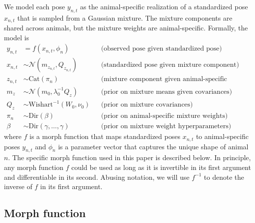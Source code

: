 \documentclass{article}         %
\newcommand{\NN}{\mathcal{N}}
\begin{document}
We model each pose $y_{n,t}$ as the animal-specific realization of a standardized pose $x_{n,t}$ that is sampled from a Gaussian mixture. The mixture components are shared across animals, but the mixture weights are animal-specific. Formally, the model is
%
\begin{align*}
    y_{n,t} & = f(x_{n,t}, \phi_n) 
        && \text{(observed pose given standardized pose)} \\
    x_{n,t} & \sim \NN(m_{z_{n,t}}, Q_{z_{n,t}}) 
        && \text{(standardized pose given mixture component)}  \\
    z_{n,t} & \sim \text{Cat}(\pi_n)  
        && \text{(mixture component given animal-specific weights)} \\
    m_z & \sim \NN(m_0, \lambda_0^{-1} Q_z) 
        && \text{(prior on mixture means given covariances)} \\
    Q_z & \sim \text{Wishart}^{-1}(W_0, \nu_0) 
        && \text{(prior on mixture covariances)} \\
    \pi_n & \sim \text{Dir}(\beta)
        && \text{(prior on animal-specific mixture weights)} \\
    \beta & \sim \text{Dir}(\gamma,\dots,\gamma)
        && \text{(prior on mixture weight hyperparameters)}
\end{align*}   
%
where $f$ is a morph function that maps standardized poses $x_{n,t}$ to animal-specific poses $y_{n,t}$ and $\phi_n$ is a parameter vector that captures the unique shape of animal $n$. The specific morph function used in this paper is described below. In principle, any morph function $f$ could be used as long as it is invertible in its first argument and differentiable in its second. Abusing notation, we will use $f^{-1}$ to denote the inverse of $f$ in its first argument.


\subsection{Morph function} \label{morph}
\end{document}
